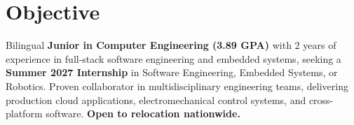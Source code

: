 \section{Objective}
Bilingual \textbf{Junior in Computer Engineering (3.89 GPA)} with 2 years of experience in full-stack software engineering and embedded systems, seeking a \textbf{Summer 2027 Internship} in Software Engineering, Embedded Systems, or Robotics. Proven collaborator in multidisciplinary engineering teams, delivering production cloud applications, electromechanical control systems, and cross-platform software. \textbf{Open to relocation nationwide.}
